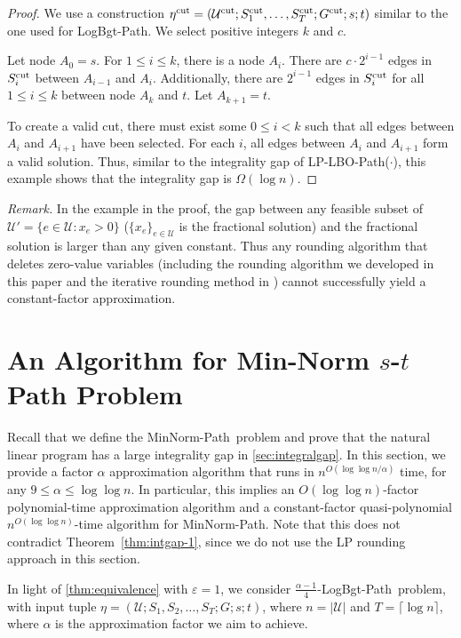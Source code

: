 \documentclass[11pt,a4paper]{article} \usepackage{enumitem}
\newcommand{\calU}{\mathcal{U}}
\newcommand{\minnormpath}{\textsf{MinNorm-Path}}
\newcommand{\LBOpath}{\textsf{LogBgt-Path}}
\newcommand{\cutU}{\operatorname{\calU^{cut}}}
\newcommand{\cutS}[1]{\ifx\relax#1\relax
    S^{\operatorname{cut}} \else
    S^{\operatorname{cut}}_{#1} \fi
}
\newcommand{\cuteta}{\operatorname{\eta^{cut}}}
\newcommand{\cutG}{G^{\operatorname{cut}}}
\theoremstyle{definition}
\begin{document}
\begin{proof}
We use a construction $\cuteta = (\cutU; \cutS{1}, \ldots, \cutS{T}; \cutG; s; t)$ similar to the one used for \LBOpath. We select positive integers $k$ and $c$.

Let node $A_0 = s$. For $1 \leq i \leq k$, there is a node $A_i$. There are $c \cdot 2^{i-1}$ edges in $\cutS{i}$ between $A_{i-1}$ and $A_i$. Additionally, there are $2^{i-1}$ edges in $\cutS{i}$ for all $1 \leq i \leq k$ between node $A_k$ and $t$. Let $A_{k+1} = t$. 

To create a valid cut, there must exist some $0 \leq i< k$ such that all edges between $A_i$ and $A_{i+1}$ have been selected. For each $i$, all edges between $A_i$ and $A_{i+1}$ form a valid solution. Thus, similar to the integrality gap of LP-LBO-Path($\cdot$), this example shows that the integrality gap is $\Omega(\log n)$.
\end{proof}


\emph{Remark.} In the example in the proof,
the gap between any feasible subset of $\calU'=\{e\in\calU:x_e>0\}$ ($\{x_e\}_{e\in\calU}$ is the fractional solution) and the fractional solution is larger than any given constant. Thus any rounding algorithm that deletes zero-value variables (including the rounding algorithm  we developed in this paper and the iterative rounding method in \cite{chakrabarty2019approximation}) 
cannot successfully yield a constant-factor approximation.

 \section{An Algorithm for Min-Norm $s$-$t$ Path Problem}
\label{sec:algo-path}
Recall that we define the \minnormpath\ problem and prove that the natural linear program has a large integrality gap in \cref{sec:integralgap}. 
In this section, 
we provide a factor $\alpha$ approximation algorithm 
that runs in $n^{O(\log\log n/\alpha)}$ time,
for any $9\le \alpha\le \log\log n$. 
In particular, this implies an $O(\log\log n)$-factor polynomial-time approximation algorithm and a constant-factor quasi-polynomial $n^{O(\log\log n)}$-time algorithm for \minnormpath.
Note that this does not contradict 
Theorem~\ref{thm:intgap-1}, since we do not use the LP 
rounding approach in this section.

In light of \cref{thm:equivalence} with $\varepsilon=1$, we consider $\frac{\alpha-1}{4}$-\LBOpath\ problem,
with input tuple $\eta=(\calU;S_{1},S_{2},\ldots,S_{T};G;s;t)$, where $n=|\calU|$ and $T=\lceil \log n\rceil$, where 
$\alpha$ is the approximation factor we aim to achieve.
\end{document}

